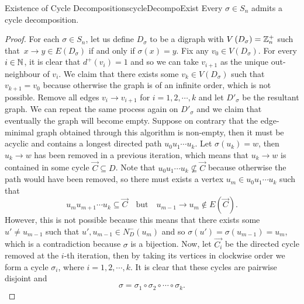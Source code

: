 \documentclass[math]{amznotes}
\theoremstyle{remark}
\newcommand{\0}{\mathbf{0}}
\newcommand{\1}{\mathbf{1}}
\begin{document}
\begin{thmbox}{Existence of Cycle Decompositions}{cycleDecompoExist}
    Every $\sigma \in S_n$ admits a cycle decomposition.
    \tcblower
    \begin{proof}
        For each $\sigma \in S_n$, let us define $D_{\sigma}$ to be a digraph with $V\left(D_{\sigma}\right) = \mathbb{Z}_n^+$ such that~$x \to y \in E\left(D_{\sigma}\right)$ if and only if $\sigma\left(x\right) = y$. Fix any $v_0 \in V\left(D_{\sigma}\right)$. For every $i \in \mathbb{N}$, it is clear that $d^{+}\left(v_i\right) = 1$ and so we can take $v_{i + 1}$ as the unique out-neighbour of $v_{i}$. We claim that there exists some $v_{k} \in V\left(D_{\sigma}\right)$ such that $v_{k + 1} = v_0$ because otherwise the graph is of an infinite order, which is not possible. Remove all edges $v_i \to v_{i + 1}$ for $i = 1, 2, \cdots, k$ and let $D'_{\sigma}$ be the resultant graph. We can repeat the same process again on $D'_{\sigma}$ and we claim that eventually the graph will become empty. Suppose on contrary that the edge-minimal graph obtained through this algorithm is non-empty, then it must be acyclic and contains a longest directed path $u_0u_1\cdots u_k$. Let $\sigma\left(u_k\right) = w$, then $u_k \to w$ has been removed in a previous iteration, which means that $u_k \to w$ is contained in some cycle $\overrightarrow{C} \subseteq D$. Note that $u_0u_1\cdots u_k \not\subseteq \overrightarrow{C}$ because otherwise the path would have been removed, so there must exists a vertex $u_m \in u_0u_1\cdots u_k$ such that
        \begin{equation*}
            u_mu_{m + 1}\cdots u_{k} \subseteq \overrightarrow{C} \quad\textrm{but}\quad u_{m - 1} \to u_m \notin E\left(\overrightarrow{C}\right).
        \end{equation*}
        However, this is not possible because this means that there exists some $u' \neq u_{m - 1}$ such that $u', u_{m - 1} \in N_D^-\left(u_m\right)$ and so $\sigma\left(u'\right) = \sigma\left(u_{m - 1}\right) = u_m$, which is a contradiction because $\sigma$ is a bijection. Now, let $\overrightarrow{C_i}$ be the directed cycle removed at the $i$-th iteration, then by taking its vertices in clockwise order we form a cycle $\sigma_i$, where $i = 1, 2, \cdots, k$. It is clear that these cycles are pairwise disjoint and 
        \begin{equation*}
            \sigma = \sigma_1 \circ \sigma_2 \circ \cdots \circ \sigma_k.
        \end{equation*}
    \end{proof}
\end{thmbox}
\end{document}
